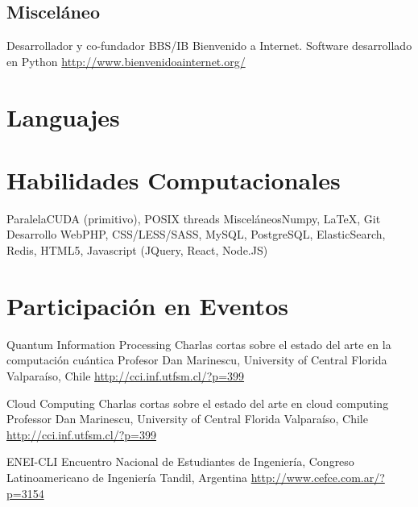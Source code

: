 \documentclass[11pt,a4paper]{moderncv}
\begin{document}
\subsection{Misceláneo}


        {Desarrollador y co-fundador}
        {BBS/IB Bienvenido a Internet. Software desarrollado en Python}
        {}
        {}
        {\url{http://www.bienvenidoainternet.org/}}

\section{Languajes}

\section{Habilidades Computacionales}
           {Paralela}{CUDA (primitivo), POSIX threads}
           {Misceláneos}{Numpy, \LaTeX, Git}
           {Desarrollo Web}{PHP, CSS/LESS/SASS, MySQL, PostgreSQL, ElasticSearch, Redis, HTML5, Javascript (JQuery, React, Node.JS)}

\section{Participación en Eventos}

        {Quantum Information Processing}
        {Charlas cortas sobre el estado del arte en la computación cuántica}
        {Profesor Dan Marinescu, University of Central Florida}
        {Valparaíso, Chile}
        {\url{http://cci.inf.utfsm.cl/?p=399}}

        {Cloud Computing}
        {Charlas cortas sobre el estado del arte en cloud computing}
        {Professor Dan Marinescu, University of Central Florida}
        {Valparaíso, Chile}
        {\url{http://cci.inf.utfsm.cl/?p=399}}

        {ENEI-CLI}
        {Encuentro Nacional de Estudiantes de Ingeniería, Congreso Latinoamericano de Ingeniería}{}
        {Tandil, Argentina}
        {\url{http://www.cefce.com.ar/?p=3154}}
\end{document}

